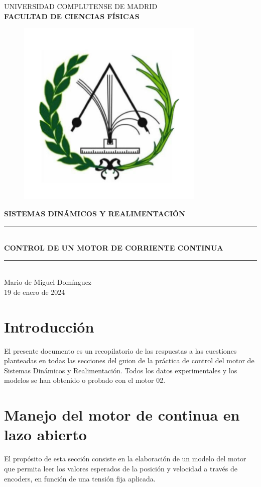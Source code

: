 \documentclass[a4paper, 12pt]{article}
\newcommand\blankpage{%
	\null
	\thispagestyle{empty}%
	\addtocounter{page}{-1}%
	\newpage}
\begin{document}
	\begin{titlepage}
		\centering
		\vfill
		\Large{UNIVERSIDAD COMPLUTENSE DE MADRID \\ \textbf{FACULTAD DE CIENCIAS FÍSICAS}}
		\vfill
		\begin{figure}[h!]
			\centering
			\includegraphics[height=9cm]{figs/cumphysics}
		\end{figure}
		\vfill 
		\large{\textbf{SISTEMAS DINÁMICOS Y REALIMENTACIÓN}}
       \vfill
        \rule [5pt]{15cm}{2pt}\\
		\Huge{\textbf{CONTROL DE UN MOTOR DE CORRIENTE CONTINUA}} \\
		\rule [8pt]{15cm}{2pt}\\
		\vfill
		\vfill
		\vfill
		\vfill
		\vfill
		\large{Mario de Miguel Domínguez\\ 19 de enero de 2024}
		\vfill
		\vfill
		\vfill
		\vfill
		
		\afterpage{\blankpage}
	\end{titlepage}
	
	\makeatletter
	\thispagestyle{empty}
	\addtocounter{page}{-1}
	

	\tableofcontents	
	\thispagestyle{empty}
	\afterpage{\blankpage}
	\newpage
\section*{Introducción}
El presente documento es un recopilatorio de las respuestas a las cuestiones planteadas en todas las secciones del guion de la práctica de control del motor de Sistemas Dinámicos y Realimentación. 
Todos los datos experimentales y los modelos se han obtenido o probado con el motor 02. 
\section{Manejo del motor de continua en lazo abierto}
El propósito de esta sección consiste en la elaboración de un modelo del motor que permita leer los valores esperados de la posición y velocidad a través de encoders, en función de una tensión fija aplicada.
\end{document}
